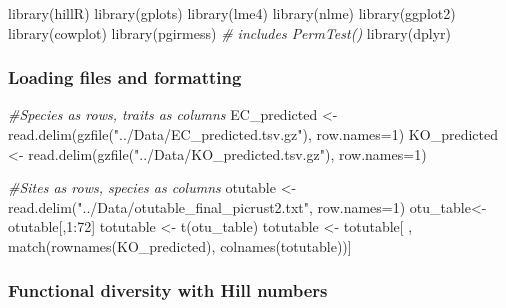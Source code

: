 \documentclass[]{interact}
\theoremstyle{plain}%
\theoremstyle{definition}
\theoremstyle{remark}
\newenvironment{Shaded}{\begin{snugshade}}{\end{snugshade}}
\newcommand{\AttributeTok}[1]{\textcolor[rgb]{0.77,0.63,0.00}{#1}}
\newcommand{\CommentTok}[1]{\textcolor[rgb]{0.56,0.35,0.01}{\textit{#1}}}
\newcommand{\DecValTok}[1]{\textcolor[rgb]{0.00,0.00,0.81}{#1}}
\newcommand{\FunctionTok}[1]{\textcolor[rgb]{0.00,0.00,0.00}{#1}}
\newcommand{\NormalTok}[1]{#1}
\newcommand{\OtherTok}[1]{\textcolor[rgb]{0.56,0.35,0.01}{#1}}
\newcommand{\SpecialCharTok}[1]{\textcolor[rgb]{0.00,0.00,0.00}{#1}}
\newcommand{\StringTok}[1]{\textcolor[rgb]{0.31,0.60,0.02}{#1}}
\begin{document}
\begin{Shaded}
\begin{Highlighting}[]
\FunctionTok{library}\NormalTok{(hillR)}
\FunctionTok{library}\NormalTok{(gplots)}
\FunctionTok{library}\NormalTok{(lme4)}
\FunctionTok{library}\NormalTok{(nlme)}
\FunctionTok{library}\NormalTok{(ggplot2)}
\FunctionTok{library}\NormalTok{(cowplot)}
\FunctionTok{library}\NormalTok{(pgirmess) }\CommentTok{\# includes PermTest()}
\FunctionTok{library}\NormalTok{(dplyr)}
\end{Highlighting}
\end{Shaded}

\hypertarget{loading-files-and-formatting}{%
\subsubsection{Loading files and
formatting}\label{loading-files-and-formatting}}

\begin{Shaded}
\begin{Highlighting}[]
\CommentTok{\#Species as rows, traits as columns}
\NormalTok{EC\_predicted }\OtherTok{\textless{}{-}} \FunctionTok{read.delim}\NormalTok{(}\FunctionTok{gzfile}\NormalTok{(}\StringTok{"../Data/EC\_predicted.tsv.gz"}\NormalTok{), }\AttributeTok{row.names=}\DecValTok{1}\NormalTok{)}
\NormalTok{KO\_predicted }\OtherTok{\textless{}{-}} \FunctionTok{read.delim}\NormalTok{(}\FunctionTok{gzfile}\NormalTok{(}\StringTok{"../Data/KO\_predicted.tsv.gz"}\NormalTok{), }\AttributeTok{row.names=}\DecValTok{1}\NormalTok{)}

\CommentTok{\#Sites as rows, species as columns}
\NormalTok{otutable }\OtherTok{\textless{}{-}} \FunctionTok{read.delim}\NormalTok{(}\StringTok{"../Data/otutable\_final\_picrust2.txt"}\NormalTok{, }\AttributeTok{row.names=}\DecValTok{1}\NormalTok{)}
\NormalTok{otu\_table}\OtherTok{\textless{}{-}}\NormalTok{ otutable[,}\DecValTok{1}\SpecialCharTok{:}\DecValTok{72}\NormalTok{]}
\NormalTok{totutable }\OtherTok{\textless{}{-}} \FunctionTok{t}\NormalTok{(otu\_table)}
\NormalTok{totutable }\OtherTok{\textless{}{-}}\NormalTok{ totutable[ , }\FunctionTok{match}\NormalTok{(}\FunctionTok{rownames}\NormalTok{(KO\_predicted), }\FunctionTok{colnames}\NormalTok{(totutable))]}
\end{Highlighting}
\end{Shaded}

\hypertarget{functional-diversity-with-hill-numbers}{%
\subsubsection{Functional diversity with Hill
numbers}\label{functional-diversity-with-hill-numbers}}
\end{document}
